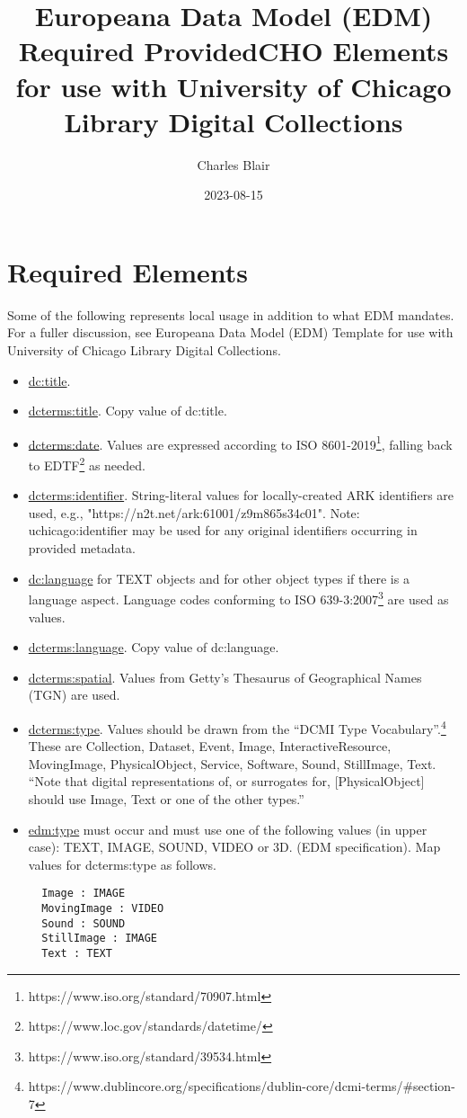 \documentclass[11pt]{article}
\date{2023-08-15}
\title{Europeana Data Model (EDM) Required ProvidedCHO Elements for use with University of Chicago Library Digital Collections}
\author{Charles Blair}
\begin{document}
\maketitle

\section*{Required Elements}
Some of the following represents local usage in addition to what EDM mandates. For a fuller discussion, see Europeana Data Model (EDM) Template for use with University of Chicago Library Digital Collections.

\begin{itemize}

  \item \underline{dc:title}.

  \item \underline{dcterms:title}. Copy value of dc:title.

  \item \underline{dcterms:date}. Values are expressed according to ISO 8601-2019\footnote{https://www.iso.org/standard/70907.html}, falling back to EDTF\footnote{https://www.loc.gov/standards/datetime/} as needed.

  \item \underline{dcterms:identifier}. String-literal values for locally-created ARK identifiers are used, e.g., "https://n2t.net/ark:61001/z9m865s34c01". Note: uchicago:identifier may be used for any original identifiers occurring in provided metadata.

  \item \underline{dc:language} for TEXT objects and for other object types if there is a language aspect. Language codes conforming to ISO 639-3:2007\footnote{https://www.iso.org/standard/39534.html} are used as values.

  \item \underline{dcterms:language}. Copy value of dc:language.

  \item \underline{dcterms:spatial}. Values from Getty's Thesaurus of Geographical Names (TGN) are used.

  \item \underline{dcterms:type}. Values should be drawn from the ``DCMI Type Vocabulary''.\footnote{https://www.dublincore.org/specifications/dublin-core/dcmi-terms/\#section-7} These are Collection, Dataset, Event, Image, InteractiveResource, MovingImage, PhysicalObject, Service, Software, Sound, StillImage, Text. ``Note that digital representations of, or surrogates for, [PhysicalObject] should use Image, Text or one of the other types.''

  \item \underline{edm:type} must occur and must use one of the following values (in upper case): TEXT, IMAGE, SOUND, VIDEO or 3D. (EDM specification). Map values for dcterms:type as follows.

\begin{verbatim}
  Image : IMAGE
  MovingImage : VIDEO
  Sound : SOUND
  StillImage : IMAGE
  Text : TEXT
\end{verbatim}

\end{itemize}
\end{document}

